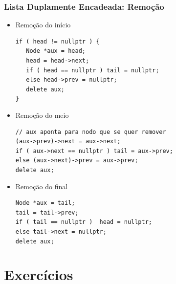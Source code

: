 \documentclass[aspectratio=169]{beamer}
\begin{document}
\begin{frame}[fragile]\frametitle{Lista Duplamente Encadeada: Remoção}
\begin{itemize}
	\item Remoção do início
\begin{lstlisting}[basicstyle=\ttfamily\tiny]
if ( head != nullptr ) {
   Node *aux = head;
   head = head->next;
   if ( head == nullptr ) tail = nullptr;
   else head->prev = nullptr;
   delete aux;
}
\end{lstlisting}
	\item Remoção do meio
\begin{lstlisting}[basicstyle=\ttfamily\tiny]
// aux aponta para nodo que se quer remover
(aux->prev)->next = aux->next;
if ( aux->next == nullptr ) tail = aux->prev;
else (aux->next)->prev = aux->prev;
delete aux;
\end{lstlisting}
	\item Remoção do final
\begin{lstlisting}[basicstyle=\ttfamily\tiny]
Node *aux = tail;
tail = tail->prev;
if ( tail == nullptr )  head = nullptr;
else tail->next = nullptr;
delete aux;
\end{lstlisting}
\end{itemize}
\end{frame}

\section{Exercícios}
\end{document}

